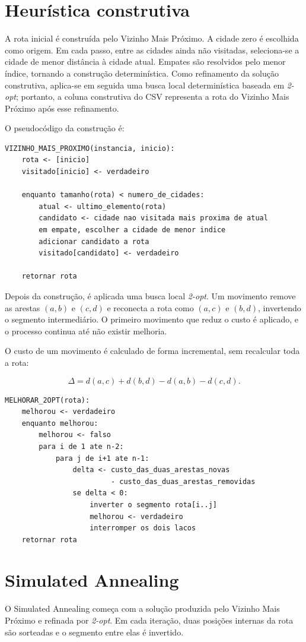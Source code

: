 \documentclass[12pt,a4paper]{article}
\begin{document}
\section{Heurística construtiva}
A rota inicial é construída pelo Vizinho Mais Próximo. A cidade zero é escolhida como origem. Em cada passo, entre as cidades ainda não visitadas, seleciona-se a cidade de menor distância à cidade atual. Empates são resolvidos pelo menor índice, tornando a construção determinística. Como refinamento da solução construtiva, aplica-se em seguida uma busca local determinística baseada em \textit{2-opt}; portanto, a coluna construtiva do CSV representa a rota do Vizinho Mais Próximo após esse refinamento.

O pseudocódigo da construção é:

\begin{Verbatim}[fontsize=\small]
VIZINHO_MAIS_PROXIMO(instancia, inicio):
	rota <- [inicio]
	visitado[inicio] <- verdadeiro

	enquanto tamanho(rota) < numero_de_cidades:
		atual <- ultimo_elemento(rota)
		candidato <- cidade nao visitada mais proxima de atual
		em empate, escolher a cidade de menor indice
		adicionar candidato a rota
		visitado[candidato] <- verdadeiro

	retornar rota
\end{Verbatim}

Depois da construção, é aplicada uma busca local \textit{2-opt}. Um movimento remove as arestas $(a,b)$ e $(c,d)$ e reconecta a rota como $(a,c)$ e $(b,d)$, invertendo o segmento intermediário. O primeiro movimento que reduz o custo é aplicado, e o processo continua até não existir melhoria.

O custo de um movimento é calculado de forma incremental, sem recalcular toda a rota:

\[
 \Delta = d(a,c)+d(b,d)-d(a,b)-d(c,d).
\]

\begin{Verbatim}[fontsize=\small]
MELHORAR_2OPT(rota):
	melhorou <- verdadeiro
	enquanto melhorou:
		melhorou <- falso
		para i de 1 ate n-2:
			para j de i+1 ate n-1:
				delta <- custo_das_duas_arestas_novas
						 - custo_das_duas_arestas_removidas
				se delta < 0:
					inverter o segmento rota[i..j]
					melhorou <- verdadeiro
					interromper os dois lacos
	retornar rota
\end{Verbatim}

\section{Simulated Annealing}
O Simulated Annealing começa com a solução produzida pelo Vizinho Mais Próximo e refinada por \textit{2-opt}. Em cada iteração, duas posições internas da rota são sorteadas e o segmento entre elas é invertido.
\end{document}
